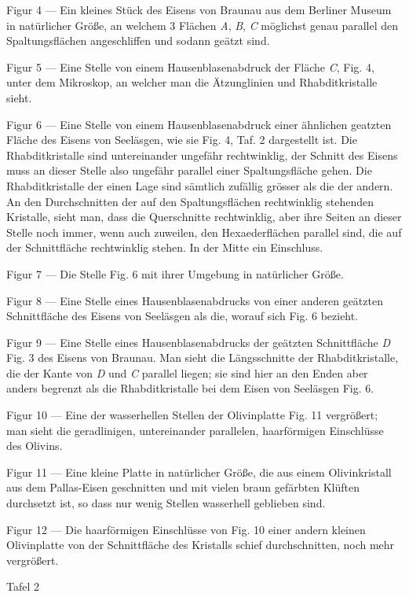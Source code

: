 \documentclass[a4paper, 11pt, oneside]{article}
\begin{document}
Figur 4 --- Ein kleines Stück des Eisens von Braunau aus dem Berliner Museum in natürlicher Größe, an welchem 3 Flächen \emph{A}, \emph{B}, \emph{C} möglichst genau parallel den Spaltungsflächen angeschliffen und sodann geätzt sind.

Figur 5 --- Eine Stelle von einem Hausenblasenabdruck der Fläche \emph{C}, Fig. 4, unter dem Mikroskop, an welcher man die Ätzunglinien und Rhabditkristalle sieht.

Figur 6 --- Eine Stelle von einem Hausenblasenabdruck einer ähnlichen geatzten Fläche des Eisens von Seeläsgen, wie sie Fig. 4, Taf. 2 dargestellt ist. Die Rhabditkristalle sind untereinander ungefähr rechtwinklig, der Schnitt des Eisens muss an dieser Stelle also ungefähr parallel einer Spaltungsfläche gehen. Die Rhabditkristalle der einen Lage sind sämtlich zufällig grösser als die der andern. An den Durchschnitten der auf den Spaltungsflächen rechtwinklig stehenden Kristalle, sieht man, dass die Querschnitte rechtwinklig, aber ihre Seiten an dieser Stelle noch immer, wenn auch zuweilen, den Hexaederflächen parallel sind, die auf der Schnittfläche rechtwinklig stehen. In der Mitte ein Einschluss.

Figur 7 --- Die Stelle Fig. 6 mit ihrer Umgebung in natürlicher Größe.

Figur 8 --- Eine Stelle eines Hausenblasenabdrucks von einer anderen geätzten Schnittfläche des Eisens von Seeläsgen als die, worauf sich Fig. 6 bezieht.

Figur 9 --- Eine Stelle eines Hausenblasenabdrucks der geätzten Schnittfläche \emph{D} Fig. 3 des Eisens von Braunau. Man sieht die Längsschnitte der Rhabditkristalle, die der Kante von \emph{D} und \emph{C} parallel liegen; sie sind hier an den Enden aber anders begrenzt als die Rhabditkristalle bei dem Eisen von Seeläsgen Fig. 6.

Figur 10 --- Eine der wasserhellen Stellen der Olivinplatte Fig. 11 vergrößert; man sieht die geradlinigen, untereinander parallelen, haarförmigen Einschlüsse des Olivins.

Figur 11 --- Eine kleine Platte in natürlicher Größe, die aus einem Olivinkristall aus dem Pallas-Eisen geschnitten und mit vielen braun gefärbten Klüften durchsetzt ist, so dass nur wenig Stellen wasserhell geblieben sind.

Figur 12 --- Die haarförmigen Einschlüsse von Fig. 10 einer andern kleinen Olivinplatte von der Schnittfläche des Kristalls schief durchschnitten, noch mehr vergrößert.

Tafel 2
\end{document}
